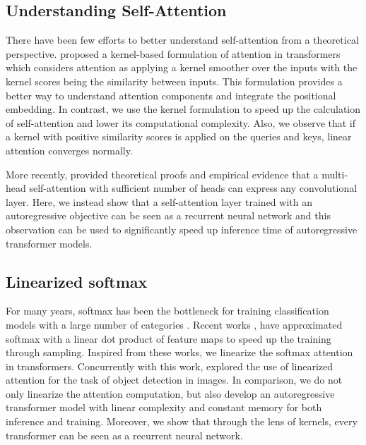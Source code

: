 \documentclass{article}
\begin{document}
\subsection{Understanding Self-Attention}

There have been few efforts to better understand self-attention from a
theoretical perspective. \citet{tsai2019transformer} proposed a kernel-based
formulation of attention in transformers which considers attention as applying
a kernel smoother over the inputs with the kernel scores being the similarity
between inputs. This formulation provides a better way to understand attention
components and integrate the positional embedding. In contrast, we use the
kernel formulation to speed up the calculation of self-attention and lower its
computational complexity. Also, we observe that if a kernel with positive
similarity scores is applied on the queries and keys, linear attention
converges normally.

More recently, \citet{Cordonnier2020On} provided theoretical proofs and
empirical evidence that a multi-head self-attention with sufficient number of
heads can express any convolutional layer. Here, we instead show that a
self-attention layer trained with an autoregressive objective can be seen as a
recurrent neural network and this observation can be used to significantly
speed up inference time of autoregressive transformer models.


\subsection{Linearized softmax}

For many years, softmax has been the bottleneck for training classification
models with a large number of categories \cite{goodman2001classes,
morin2005hierarchical, mnih2009scalable}. Recent works \cite{blanc2017adaptive,
rawat2019sampled}, have approximated softmax with a linear dot product of
feature maps to speed up the training through sampling. Inspired from these
works, we linearize the softmax attention in transformers. Concurrently with
this work, \citet{shen2020efficient} explored the use of linearized attention for
the task of object detection in images. In comparison, we do not only linearize the
attention computation, but also develop an autoregressive transformer model with
linear complexity and constant memory for both inference and training.
Moreover, we show that through the lens of kernels, every transformer can be
seen as a recurrent neural network.
\end{document}
